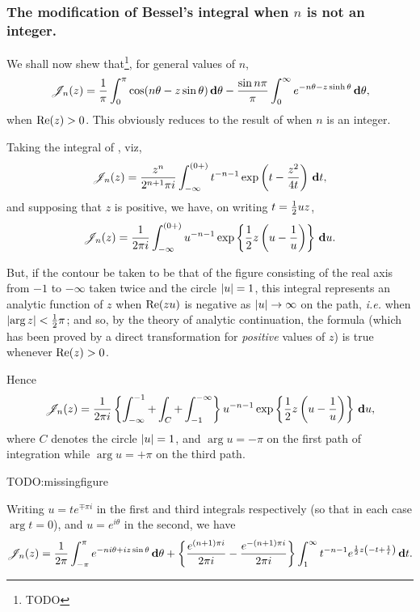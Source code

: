 \documentclass{book}
\begin{document}
\subsubsection{The modification of Bessel's integral when $n$ is not
  an integer.}
We shall now shew that\footnote{TODO}, for general values of $n$,
\begin{equation}
  \mathscr{J}_n(z) 
  =
  \frac{1}{\pi}
  \int_0^{\pi} \cos(n\theta - z\sin\theta) \, \mathbf{d}\theta
  -
  \frac{\sin n\pi}{\pi}
  \int_0^{\infty} e^{-n\theta - z\sinh\theta} \, \mathbf{d}\theta,
\end{equation}
when $\mathrm{Re}(z) > 0$. This obviously reduces to the result of
 when $n$ is an integer.

Taking the integral of , viz,
$$
\mathscr{J}_n(z) 
=
\frac{z^n}{2^{n+1}\pi i}
\int_{-\infty}^{(0+)}
t^{-n-1}
\exp\left(  t - \frac{z^2}{4t}   \right)
\, \mathbf{d} t,
$$
% 
% 
and supposing that $z$ is positive, we have, on writing
$t = \frac{1}{2} u z$,
$$
\mathscr{J}_n(z) 
= 
\frac{1}{2\pi i} 
\int_{-\infty}^{(0+)}
u^{-n-1}
\exp \left\{  \frac{1}{2} z \left(  u - \frac{1}{u}   \right)   \right\}
\, \mathbf{d} u.
$$

But, if the contour be taken to be that of the figure consisting of
the real axis from $-1$ to $-\infty$ taken twice and the circle 
$\left| u \right| = 1$, this integral represents an analytic function of $z$
when $\mathrm{Re}(zu)$ is negative as
$\left| u \right| \rightarrow \infty$ on the path, \emph{i.e.} when 
$\left|  \arg z  \right| < \frac{1}{2} \pi$; and so, by the theory of analytic
continuation, the formula (which has been proved by a direct
transformation for \emph{positive} values of $z$) is true whenever 
$\mathrm{Re}(z) > 0$.

Hence
$$
\mathscr{J}_n(z)
=
\frac{1}{2\pi i}
\left\{ 
  \int_{-\infty}^{-1}
  +
  \int_C
  +
  \int_{-1}^{-\infty}
 \right\}
u^{-n-1}
\exp\left\{  \frac{1}{2} z \left(  u - \frac{1}{u}   \right)   \right\}
\, \mathbf{d} u,
$$
where $C$ denotes the circle $\left| u \right| = 1$, and 
$\arg u = -\pi$ on the first path of integration while 
$\arg u = +\pi$ on the third path.

TODO:missingfigure

Writing $u = t e^{\mp \pi i}$ in the first and third integrals
respectively (so that in each case $\arg t = 0$), and 
$u = e^{i\theta}$ in the second, we have
$$
\mathscr{J}_n(z) 
=
\frac{1}{2\pi}
\int_{-\pi}^{\pi}
e^{-ni\theta + iz\sin\theta}
\, \mathbf{d} \theta
+
\left\{ 
  \frac{e^{(n+1)\pi i}}{2\pi i}
  -
  \frac{e^{-(n+1)\pi i}}{2\pi i}
 \right\}
\int_1^{\infty}
t^{-n-1}
e^{\frac{1}{2} z \left( -t + \frac{1}{t} \right)}
\, \mathbf{d} t.
$$
\end{document}
